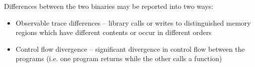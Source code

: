 Differences between the two binaries may be reported into two ways:
\begin{itemize}
\item Observable trace differences -- library calls or writes to distinguished memory regions which have different contents or occur in different orders
\item Control flow divergence -- significant divergence in control flow between the programs (i.e. one program returns while the other calls a function)
\end{itemize}



